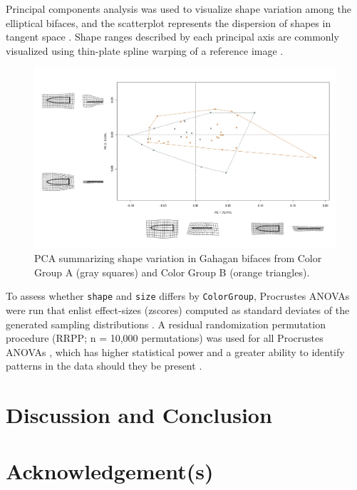 \documentclass[]{interact}
\theoremstyle{plain}%
\theoremstyle{definition}
\theoremstyle{remark}
\begin{document}
Principal components analysis \citep{RN1746} was used to visualize shape
variation among the elliptical bifaces, and the scatterplot represents
the dispersion of shapes in tangent space
\citep{RN8633, RN5616, RN11143, RN7550}. Shape ranges described by each
principal axis are commonly visualized using thin-plate spline warping
of a reference image \citep{RN1731, RN479}.

\begin{figure}
\includegraphics[width=1\linewidth]{ms_files/figure-latex/pcashape-1} \caption{PCA summarizing shape variation in Gahagan bifaces from Color Group A (gray squares) and Color Group B (orange triangles).}\label{fig:figpcashape}
\end{figure}

To assess whether \texttt{shape} and \texttt{size} differs by
\texttt{ColorGroup}, Procrustes ANOVAs \citep{RN1749} were run that
enlist effect-sizes (zscores) computed as standard deviates of the
generated sampling distributions \citep{RN1756}. A residual
randomization permutation procedure (RRPP; n = 10,000 permutations) was
used for all Procrustes ANOVAs \citep{RN1655, RN11775}, which has higher
statistical power and a greater ability to identify patterns in the data
should they be present \citep{RN1719}.

\hypertarget{discussion-and-conclusion}{%
\section{Discussion and Conclusion}\label{discussion-and-conclusion}}

\hypertarget{acknowledgements}{%
\section*{Acknowledgement(s)}\label{acknowledgements}}
\end{document}
